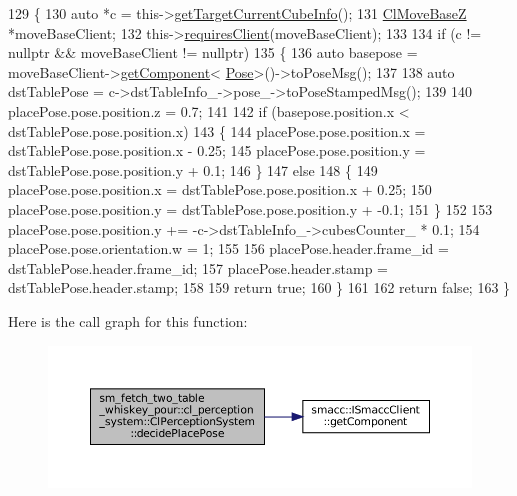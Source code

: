 \begin{DoxyCode}
129             \{
130                 \textcolor{keyword}{auto} *c = this->\hyperlink{classsm__fetch__two__table__whiskey__pour_1_1cl__perception__system_1_1ClPerceptionSystem_a09899882cdea9c265e98881bb903882b}{getTargetCurrentCubeInfo}();
131                 \hyperlink{classcl__move__base__z_1_1ClMoveBaseZ}{ClMoveBaseZ} *moveBaseClient;
132                 this->\hyperlink{classsmacc_1_1ISmaccClient_a7a9990a2f3e35d547671188d69fee520}{requiresClient}(moveBaseClient);
133 
134                 \textcolor{keywordflow}{if} (c != \textcolor{keyword}{nullptr} && moveBaseClient != \textcolor{keyword}{nullptr})
135                 \{
136                     \textcolor{keyword}{auto} basepose = moveBaseClient->\hyperlink{classsmacc_1_1ISmaccClient_adef78db601749ca63c19e74a27cb88cc}{getComponent}<
      \hyperlink{classcl__move__base__z_1_1Pose}{Pose}>()->toPoseMsg();
137 
138                     \textcolor{keyword}{auto} dstTablePose = c->dstTableInfo\_->pose\_->toPoseStampedMsg();
139 
140                     placePose.pose.position.z = 0.7;
141 
142                     \textcolor{keywordflow}{if} (basepose.position.x < dstTablePose.pose.position.x)
143                     \{
144                         placePose.pose.position.x = dstTablePose.pose.position.x - 0.25;
145                         placePose.pose.position.y = dstTablePose.pose.position.y + 0.1;
146                     \}
147                     \textcolor{keywordflow}{else}
148                     \{
149                         placePose.pose.position.x = dstTablePose.pose.position.x + 0.25;
150                         placePose.pose.position.y = dstTablePose.pose.position.y + -0.1;
151                     \}
152 
153                     placePose.pose.position.y += -c->dstTableInfo\_->cubesCounter\_ * 0.1;
154                     placePose.pose.orientation.w = 1;
155 
156                     placePose.header.frame\_id = dstTablePose.header.frame\_id;
157                     placePose.header.stamp = dstTablePose.header.stamp;
158 
159                     \textcolor{keywordflow}{return} \textcolor{keyword}{true};
160                 \}
161 
162                 \textcolor{keywordflow}{return} \textcolor{keyword}{false};
163             \}
\end{DoxyCode}
Here is the call graph for this function\+:
\nopagebreak
\begin{figure}[H]
\begin{center}
\leavevmode
\includegraphics[width=350pt]{classsm__fetch__two__table__whiskey__pour_1_1cl__perception__system_1_1ClPerceptionSystem_a803c5d30981b6368e854dd9e8972f129_cgraph}
\end{center}
\end{figure}
